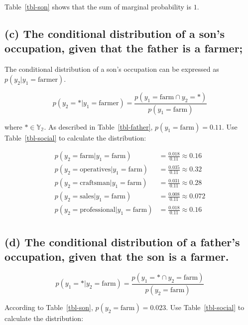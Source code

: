 \documentclass[
  letterpaper,
  DIV=11,
  numbers=noendperiod]{scrreprt}
\begin{document}
Table~\ref{tbl-son} shows that the sum of marginal probability is \(1\).

\hypertarget{c-the-conditional-distribution-of-a-sons-occupation-given-that-the-father-is-a-farmer}{%
\subsection{(c) The conditional distribution of a son's occupation,
given that the father is a
farmer;}\label{c-the-conditional-distribution-of-a-sons-occupation-given-that-the-father-is-a-farmer}}

The conditional distribution of a son's occupation can be expressed as
\(p(y_2 | y_1 = \text{farmer})\).

\[p(y_2= * | y_1 = \text{farmer}) = \frac{p(y_1=\text{farm} \cap y_2 = *)}{p(y_1 = \text{farm})}\]

where \(* \in \mathbb{Y_2}\). As described in Table~\ref{tbl-father},
\(p(y_1=\text{farm})= 0.11\). Use Table~\ref{tbl-social} to calculate
the distribution:

\[
\begin{aligned}
    p(y_2 = \text{farm} | y_1 = \text{farm}) &= \frac{0.018}{0.11} \approx 0.16\\
    p(y_2 = \text{operatives} | y_1 = \text{farm}) &= \frac{0.035}{0.11} \approx 0.32\\
    p(y_2 = \text{craftsman} | y_1 = \text{farm}) &= \frac{0.031}{0.11} \approx 0.28\\
    p(y_2 = \text{sales} | y_1 = \text{farm}) &= \frac{0.008}{0.11} \approx 0.072\\
    p(y_2 = \text{professional} | y_1 = \text{farm}) &= \frac{0.018}{0.11} \approx 0.16 \\
\end{aligned}
\]

\hypertarget{d-the-conditional-distribution-of-a-fathers-occupation-given-that-the-son-is-a-farmer.}{%
\subsection{(d) The conditional distribution of a father's occupation,
given that the son is a
farmer.}\label{d-the-conditional-distribution-of-a-fathers-occupation-given-that-the-son-is-a-farmer.}}

\[p(y_1= * | y_2 = \text{farm}) = \frac{p(y_1=\text{*} \cap y_2 = \text{farm})}{p(y_2 = \text{farm})}\]

According to Table~\ref{tbl-son}, \(p(y_2 = \text{farm}) = 0.023\). Use
Table~\ref{tbl-social} to calculate the distribution:
\end{document}
